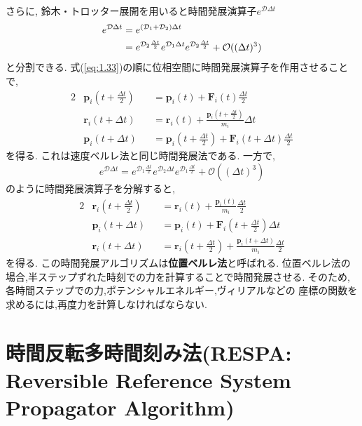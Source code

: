 さらに, 鈴木・トロッター展開を用いると時間発展演算子$e^{\mathcal{D} \Delta t}$
\begin{align}
 e^{\mathcal{D} \Delta t}
  &=  e^{(\mathcal{D}_{1} + \mathcal{D}_{2}) \Delta t}
 \notag
 \\ 
  &=  e^{\mathcal{D}_{2} \frac{\Delta t}{2}}
      e^{\mathcal{D}_{1} \Delta t}
      e^{\mathcal{D}_{2} \frac{\Delta t}{2}}
    + \mathcal{O}((\Delta t)^{3})
 \label{eq:1.33}
\end{align}
と分割できる. 
式(\ref{eq:1.33})の順に位相空間に時間発展演算子を作用させることで,
\begin{alignat}{2}
 &\bm{p}_{i} \left(t + \frac{\Delta t}{2} \right)
 &&= \bm{p}_{i} (t) + \bm{F}_{i} (t) \frac{\Delta t}{2}
 \label{eq:1.37}
 \\
 &\bm{r}_{i} (t + \Delta t)
 &&=  \bm{r}_{i} (t)
    + \frac{\bm{p}_{i} (t + \frac{\Delta t}{2})}{m_{i}} \Delta t
 \label{eq:1.38}
 \\
 &\bm{p}_{i} \left(t + \Delta t \right)
 &&= \bm{p}_{i} \left(t + \frac{\Delta t}{2}\right) + \bm{F}_{i} (t + \Delta t) \frac{\Delta t}{2}
 \label{eq:1.39}
\end{alignat}
を得る. これは速度ベルレ法と同じ時間発展法である. 
一方で,
\begin{equation}
 e^{\mathcal{D} \Delta t}
  =  e^{\mathcal{D}_{1} \frac{\Delta t}{2}}
     e^{\mathcal{D}_{2} \Delta t}
     e^{\mathcal{D}_{1} \frac{\Delta t}{2}}
  +  \mathcal{O}((\Delta t)^{3})
\end{equation}
のように時間発展演算子を分解すると,
\begin{alignat}{2}
 &\bm{r}_{i} \left(t + \frac{\Delta t}{2} \right)
 &&= \bm{r}_{i} (t) + \frac{\bm{p}_{i}(t)}{m_{i}} \frac{\Delta t}{2}
 \label{eq:1.40}
 \\
 &\bm{p}_{i} (t + \Delta t)
 &&=  \bm{p}_{i} (t)
    + \bm{F}_{i} \left( t + \frac{\Delta t}{2} \right) \Delta t
 \label{eq:1.41}
 \\
 &\bm{r}_{i} \left(t + \Delta t \right)
 &&=  \bm{r}_{i} \left(t + \frac{\Delta t}{2} \right)
    + \frac{\bm{p}_{i}(t + \Delta t)}{m_{i}} \frac{\Delta t}{2}
 \label{eq:1.42}
\end{alignat}
を得る. この時間発展アルゴリズムは{\bf{位置ベルレ法}}と呼ばれる. 
位置ベルレ法の場合,半ステップずれた時刻での力を計算することで時間発展させる. 
そのため,各時間ステップでの力,ポテンシャルエネルギー,ヴィリアルなどの
座標の関数を求めるには,再度力を計算しなければならない. 




\section{時間反転多時間刻み法(RESPA: Reversible Reference System Propagator Algorithm)}
